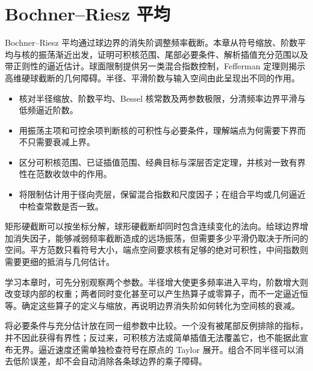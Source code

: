 \chapter{Bochner–Riesz 平均}
\label{b2:ch:24}
\begin{chapterabstract}
Bochner--Riesz 平均通过球边界的消失阶调整频率截断。本章从符号缩放、阶数平均与核的振荡渐近出发，证明可积核范围、尾部必要条件、解析插值充分范围以及带正则性的逼近估计。球面限制提供另一类混合指数控制，Fefferman 定理则揭示高维硬球截断的几何障碍。半径、平滑阶数与输入空间由此呈现出不同的作用。
\end{chapterabstract}

\begin{learninggoals}\begin{itemize}
\item\label{b2:item:24-goal-1}核对半径缩放、阶数平均、Bessel 核常数及两参数极限，分清频率边界平滑与低频逼近阶数。
\item\label{b2:item:24-goal-2}用振荡主项和可控余项判断核的可积性与必要条件，理解端点为何需要下界而不只需要衰减上界。
\item\label{b2:item:24-goal-3}区分可积核范围、已证插值范围、经典目标与深层否定定理，并核对一致有界性在范数收敛中的作用。
\item\label{b2:item:24-goal-4}将限制估计用于径向壳层，保留混合指数和尺度因子；在组合平均或几何逼近中检查常数是否一致。
\end{itemize}\end{learninggoals}

矩形硬截断可以按坐标分解，球形硬截断却同时包含连续变化的法向。给球边界增加消失因子，能够减弱频率截断造成的远场振荡，但需要多少平滑仍取决于所问的空间。平方范数只看符号大小，端点空间要求核有足够的绝对可积性，中间指数则需要更细的抵消与几何估计。

\ProseParagraphBreak

学习本章时，可先分别观察两个参数。半径增大使更多频率进入平均，阶数增大则改变球内部的权重；两者同时变化甚至可以产生热算子或零算子，而不一定逼近恒等。确定这些算子的定义与缩放，再说明边界消失阶如何转化为空间核的衰减。

\ProseParagraphBreak

将必要条件与充分估计放在同一组参数中比较。一个没有被尾部反例排除的指标，并不因此获得有界性；反过来，可积核方法或简单插值无法覆盖它，也不能据此宣布无界。逼近速度还需单独检查符号在原点的 Taylor 展开。组合不同半径可以消去低阶误差，却不会自动消除各条球边界的乘子障碍。

